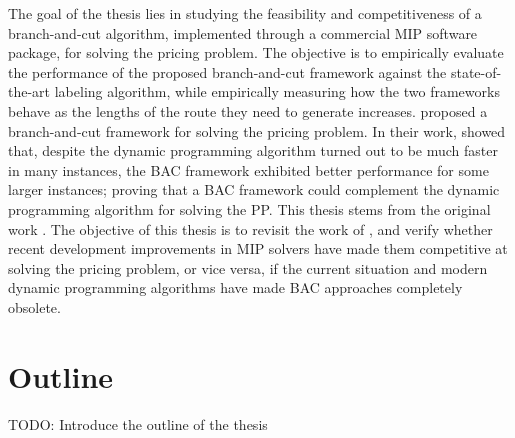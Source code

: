 The goal of the thesis lies in studying the feasibility and competitiveness of a
branch-and-cut algorithm, implemented through a commercial MIP software package,
for solving the pricing problem.
The objective is to empirically evaluate the performance of the proposed
branch-and-cut framework against the state-of-the-art labeling
algorithm, while empirically measuring how the two frameworks behave
as the lengths of the route they need to generate increases.
\cite{jepsen2014} proposed a branch-and-cut framework for solving the pricing problem.
In their work, \citeauthor{jepsen2014} showed that, despite the dynamic programming algorithm
turned out to be much faster in many instances, the BAC framework exhibited
better performance for some larger instances; proving that
a BAC framework could complement the dynamic programming algorithm for solving the PP.
This thesis stems from the original work \citeauthor{jepsen2014}.
The objective of this thesis is to revisit the work of \citeauthor{jepsen2014},
and verify whether recent development improvements in MIP solvers
have made them competitive at solving the pricing problem,
or vice versa,
if the current situation and modern dynamic programming algorithms have
made BAC approaches completely obsolete.


\section{Outline}
\label{sec:intro-outline}

TODO: Introduce the outline of the thesis
